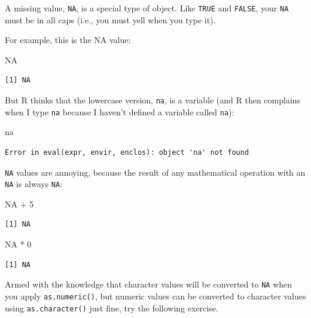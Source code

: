 \documentclass[
  letterpaper,
  DIV=11,
  numbers=noendperiod]{scrreprt}
\newenvironment{Shaded}{\begin{snugshade}}{\end{snugshade}}
\newcommand{\ConstantTok}[1]{\textcolor[rgb]{0.56,0.35,0.01}{#1}}
\newcommand{\DecValTok}[1]{\textcolor[rgb]{0.68,0.00,0.00}{#1}}
\newcommand{\NormalTok}[1]{\textcolor[rgb]{0.00,0.23,0.31}{#1}}
\newcommand{\SpecialCharTok}[1]{\textcolor[rgb]{0.37,0.37,0.37}{#1}}
\begin{document}
A missing value, \texttt{NA}, is a special type of object. Like
\texttt{TRUE} and \texttt{FALSE}, your \texttt{NA} must be in all caps
(i.e., you must yell when you type it).

For example, this is the NA value:

\begin{Shaded}
\begin{Highlighting}[]
\ConstantTok{NA}
\end{Highlighting}
\end{Shaded}

\begin{verbatim}
[1] NA
\end{verbatim}

But R thinks that the lowercase version, \texttt{na}, is a variable (and
R then complains when I type \texttt{na} because I haven't defined a
variable called \texttt{na}):

\begin{Shaded}
\begin{Highlighting}[]
\NormalTok{na}
\end{Highlighting}
\end{Shaded}

\begin{verbatim}
Error in eval(expr, envir, enclos): object 'na' not found
\end{verbatim}

\texttt{NA} values are annoying, because the result of any mathematical
operation with an \texttt{NA} is always \texttt{NA}:

\begin{Shaded}
\begin{Highlighting}[]
\ConstantTok{NA} \SpecialCharTok{+} \DecValTok{5}
\end{Highlighting}
\end{Shaded}

\begin{verbatim}
[1] NA
\end{verbatim}

\begin{Shaded}
\begin{Highlighting}[]
\ConstantTok{NA} \SpecialCharTok{*} \DecValTok{0}
\end{Highlighting}
\end{Shaded}

\begin{verbatim}
[1] NA
\end{verbatim}

Armed with the knowledge that character values will be converted to
\texttt{NA} when you apply \texttt{as.numeric()}, but numeric values can
be converted to character values using \texttt{as.character()} just
fine, try the following exercise.
\end{document}
